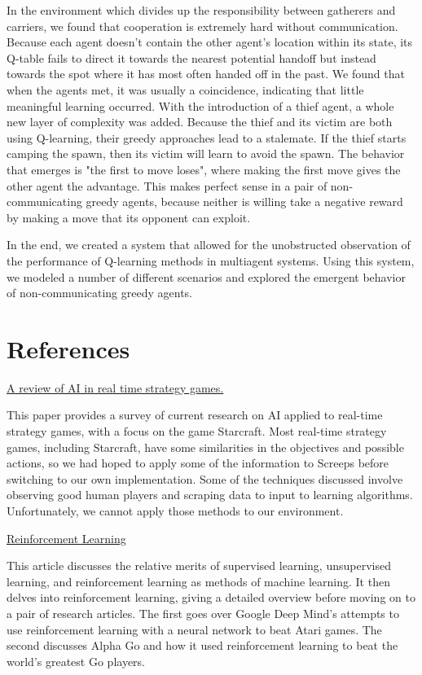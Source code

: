 \documentclass[11pt]{article}
\begin{document}
	In the environment which divides up the responsibility between gatherers and carriers, we found that cooperation is extremely hard without communication. Because each agent doesn't contain the other agent's location within its state, its Q-table fails to direct it towards the nearest potential handoff but instead towards the spot where it has most often handed off in the past. We found that when the agents met, it was usually a coincidence, indicating that little meaningful learning occurred. With the introduction of a thief agent, a whole new layer of complexity was added. Because the thief and its victim are both using Q-learning, their greedy approaches lead to a stalemate. If the thief starts camping the spawn, then its victim will learn to avoid the spawn. The behavior that emerges is "the first to move loses", where making the first move gives the other agent the advantage. This makes perfect sense in a pair of non-communicating greedy agents, because neither is willing take a negative reward by making a move that its opponent can exploit.

In the end, we created a system that allowed for the unobstructed observation of the performance of Q-learning methods in multiagent systems. Using this system, we modeled a number of different scenarios and explored the emergent behavior of non-communicating greedy agents.   

\section{References}


\href{http://www.cs.mun.ca/~dchurchill/pdf/starcraft_survey.pdf}{A review of AI in real time strategy games.}

This paper provides a survey of current research on AI applied to real-time strategy games, with a focus on the game Starcraft. Most real-time strategy games, including Starcraft, have some similarities in the objectives and possible actions, so we had hoped to apply some of the information to Screeps before switching to our own implementation. Some of the techniques discussed involve observing good human players and scraping data to input to learning algorithms. Unfortunately, we cannot apply those methods to our environment.


\noindent\href{https://adeshpande3.github.io/Deep-Learning-Research-Review-Week-2-Reinforcement-Learning}{Reinforcement Learning}

This article discusses the relative merits of supervised learning, unsupervised learning, and reinforcement learning as methods of machine learning. It then delves into reinforcement learning, giving a detailed overview before moving on to a pair of research articles. The first goes over Google Deep Mind’s attempts to use reinforcement learning with a neural network to beat Atari games. The second discusses Alpha Go and how it used reinforcement learning to beat the world’s greatest Go players.
\end{document}
